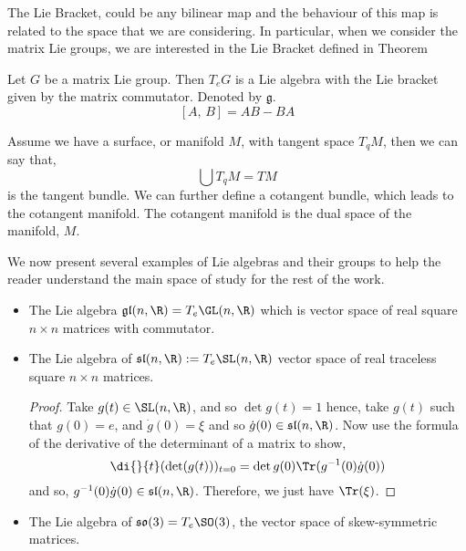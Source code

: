 \noindent
The Lie Bracket, could be any bilinear map and the behaviour of this map is related to the space that we are considering. In particular, when we consider the matrix Lie groups, we are interested in the Lie Bracket defined in Theorem 

\begin{nthm}\label{ref:LBthm}
  Let $G$ be a matrix Lie group. Then $T_eG$ is a Lie algebra with the Lie bracket given by the matrix commutator. Denoted by $\mathfrak{g}$.
  $$ [A,\, B] = AB - BA $$
\end{nthm}

\noindent
Assume we have a surface, or manifold $M$, with tangent space $T_qM$, then we can say that,
$$ \bigcup T_qM = TM $$
is the tangent bundle. We can further define a cotangent bundle, which leads to the cotangent manifold. The cotangent manifold is the dual space of the manifold, $M$.\newpage

\noindent
We now present several examples of Lie algebras and their groups to help the reader understand the main space of study for the rest of the work.

\begin{eg}
  \leavevmode
  \begin{itemize}
    \item The Lie algebra $\mathfrak{gl}(n, \R) = T_e\GL(n, \R)$ which is vector space of real square $n \times n$ matrices with commutator.
    \item The Lie algebra of $\mathfrak{sl}(n, \R) := T_e \SL(n, \R)$ vector space of real traceless square $n \times n$ matrices.
    \begin{proof}
      Take $g(t) \in \SL(n, \R)$, and so $\det g(t) = 1$ hence, take $g(t)$ such that $g(0) = e$, and $\dot g(0) = \xi$ and so $\dot g(0) \in \mathfrak{sl}(n, \R)$. Now use the formula of the derivative of the determinant of a matrix to show,
      $$ \di {}{t} (\det (g(t)))_{t=0} = \det {g(0)}\Tr(g^{-1}(0)\dot g(0)) $$
      and so, $g^{-1}(0)\dot g(0) \in \mathfrak{sl}(n, \R)$. Therefore, we just have $\Tr (\xi)$.
    \end{proof}
    \item The Lie algebra of $\mathfrak{so}(3) = T_e\SO(3)$, the vector space of skew-symmetric matrices.
  \end{itemize}
\end{eg}


